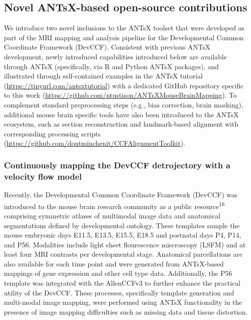 \documentclass[
  12pt,
]{article}
\begin{document}
\subsection{Novel ANTsX-based open-source
contributions}\label{novel-antsx-based-open-source-contributions}

We introduce two novel inclusions to the ANTsX toolset that were
developed as part of the MRI mapping and analysis pipeline for the
Developmental Common Coordinate Framework (DevCCF). Consistent with
previous ANTsX development, newly introduced capabilities introduced
below are available through ANTsX (specifically, via R and Python ANTsX
packages), and illustrated through self-contained examples in the ANTsX
tutorial (\url{https://tinyurl.com/antsxtutorial}) with a dedicated
GitHub repository specific to this work
(\url{https://github.com/ntustison/ANTsXMouseBrainMapping}). To
complement standard preprocessing steps (e.g., bias correction, brain
masking), additional mouse brain specific tools have also been
introduced to the ANTsX ecosystem, such as section reconstruction and
landmark-based alignment with corresponding processing scripts
(\url{https://github.com/dontminchenit/CCFAlignmentToolkit}).

\subsubsection{Continuously mapping the DevCCF detrojectory with a
velocity flow
model}\label{continuously-mapping-the-devccf-detrojectory-with-a-velocity-flow-model}

Recently, the Developmental Common Coordinate Framework (DevCCF) was
introduced to the mouse brain research community as a public
resource\textsuperscript{16} comprising symmetric atlases of multimodal
image data and anatomical segmentations defined by developmental
ontology. These templates sample the mouse embryonic days E11.5, E13.5,
E15.5, E18.5 and postnatal days P4, P14, and P56. Modalities include
light sheet flourescence miscroscopy (LSFM) and at least four MRI
contrasts per developmental stage. Anatomical parcellations are also
available for each time point and were generated from ANTsX-based
mappings of gene expression and other cell type data. Additionally, the
P56 template was integrated with the AllenCCFv3 to further enhance the
practical utility of the DevCCF. These processes, specifically template
generation and multi-modal image mapping, were performed using ANTsX
functionality in the presence of image mapping difficulties such as
missing data and tissue distortion.
\end{document}
